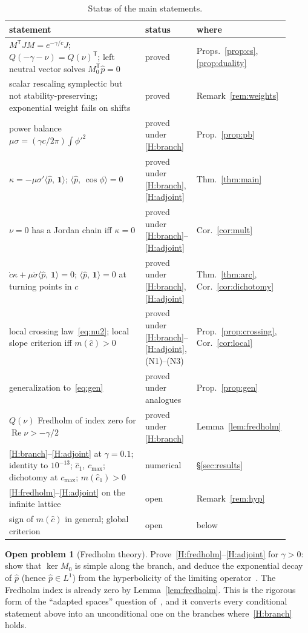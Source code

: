 \documentclass[11pt]{article}
\theoremstyle{plain}
\theoremstyle{definition}
\newtheorem{openproblem}{Open problem}
\theoremstyle{remark}
\newcommand{\ip}[2]{\langle #1,\,#2\rangle}
\newcommand{\ph}{\hat p}
\newcommand{\one}{\mathbf 1}
\newcommand{\T}{\mathsf T}
\newcommand{\chat}{\hat c_1}
\newcommand{\cmax}{c_{\max}}
\newcommand{\tagP}{\textsf{proved}}
\newcommand{\tagC}[1]{\textsf{proved under #1}}
\newcommand{\tagN}{\textsf{numerical}}
\newcommand{\tagO}{\textsf{open}}
\begin{document}
\begin{table}[h]
\centering\small
\caption{Status of the main statements.}
\label{tab:status}
\begin{tabular}{@{}p{0.52\linewidth}p{0.18\linewidth}p{0.22\linewidth}@{}}
\toprule
statement & status & where\\
\midrule
$M^{\T}JM=e^{-\gamma/c}J$; $Q(-\gamma-\nu)=Q(\nu)^{\T}$; left neutral vector solves
$M_0^{\T}\ph=0$ & \tagP & Props.~\ref{prop:cs}, \ref{prop:duality}\\
scalar rescaling symplectic but not stability-preserving; exponential weight fails on
shifts & \tagP & Remark~\ref{rem:weights}\\
power balance $\mu\sigma=(\gamma c/2\pi)\int\phi'^2$ & \tagC{\ref{H:branch}} & Prop.~\ref{prop:pb}\\
$\kappa=-\mu\sigma'\ip{\ph}{\one}$; $\ip{\ph}{\cos\phi}=0$ &
\tagC{\ref{H:branch},\ref{H:adjoint}} & Thm.~\ref{thm:main}\\
$\nu=0$ has a Jordan chain iff $\kappa=0$ & \tagC{\ref{H:branch}--\ref{H:adjoint}} &
Cor.~\ref{cor:mult}\\
$\dot c\kappa+\mu\dot\sigma\ip{\ph}{\one}=0$; $\ip{\ph}{\one}=0$ at turning points in $c$ &
\tagC{\ref{H:branch},\ref{H:adjoint}} & Thm.~\ref{thm:arc}, Cor.~\ref{cor:dichotomy}\\
local crossing law~\eqref{eq:nu2}; local slope criterion iff $m(\hat c)>0$ &
\tagC{\ref{H:branch}--\ref{H:adjoint}, (N1)--(N3)} & Prop.~\ref{prop:crossing},
Cor.~\ref{cor:local}\\
generalization to~\eqref{eq:gen} & \tagC{analogues} & Prop.~\ref{prop:gen}\\
$Q(\nu)$ Fredholm of index zero for $\operatorname{Re}\nu>-\gamma/2$ &
\tagC{\ref{H:branch}} & Lemma~\ref{lem:fredholm}\\
\ref{H:branch}--\ref{H:adjoint} at $\gamma=0.1$; identity to $10^{-13}$; $\chat$, $\cmax$;
dichotomy at $\cmax$; $m(\chat)>0$ & \tagN & \S\ref{sec:results}\\
\ref{H:fredholm}--\ref{H:adjoint} on the infinite lattice & \tagO & Remark~\ref{rem:hyp}\\
sign of $m(\hat c)$ in general; global criterion & \tagO & below\\
\bottomrule
\end{tabular}
\end{table}

\begin{openproblem}[Fredholm theory]\label{op:fredholm}
Prove~\ref{H:fredholm}--\ref{H:adjoint} for $\gamma>0$: show that $\ker M_0$ is simple along
the branch, and deduce the exponential decay of $\ph$ (hence $\ph\in L^1$) from the
hyperbolicity of the limiting operator~\cite{MP99}. The Fredholm index is already zero by
Lemma~\ref{lem:fredholm}. This is the rigorous form of the ``adapted spaces'' question
of~\cite{VCKX20}, and it converts every conditional statement above into an unconditional
one on the branches where~\ref{H:branch} holds.
\end{openproblem}
\end{document}
